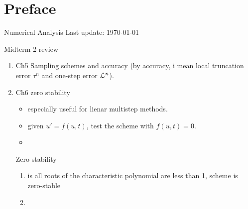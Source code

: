 \documentclass[12pt,oneside,openany]{memoir}
\begin{document}
    \chapter*{Preface}
    Numerical Analysis
    \vspace{-25pt}
    \tableofcontents
    \vfill
    \specialdate
    Last update: \today

    \newpage

    Midterm 2 review
    \begin{enumerate}[label = (\arabic*),itemsep=1pt,topsep=3pt]
        \item Ch5 Sampling schemes and accuracy (by accuracy, i mean local truncation error $\tau^n$ and one-step error $\mathcal{L}^n$).
        \item Ch6 zero stability 
            \begin{itemize}
                \item especially useful for lienar multistep methods.
                \item given $u' = f(u,t)$, test the scheme with $f(u,t) = 0$.
                \item
            \end{itemize}
            Zero stability 
            \begin{enumerate}[label = (\arabic*),itemsep=1pt,topsep=3pt]
                \item is all roots of the characteristic polynomial are less than 1, scheme is zero-stable
                \item 
            \end{enumerate}
    \end{enumerate}
\end{document}
